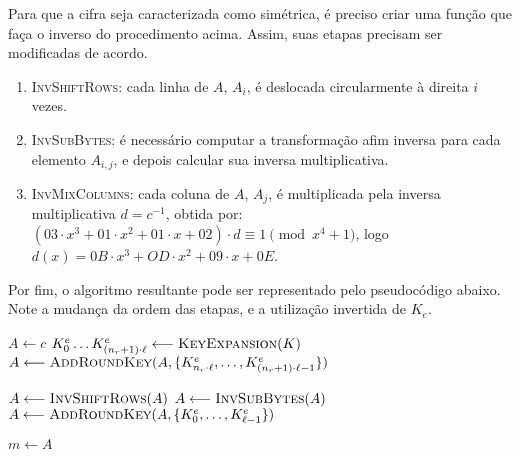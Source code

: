 \documentclass[12pt]{report}
\begin{document}
Para que a cifra seja caracterizada como simétrica, é preciso criar uma função que faça o inverso do procedimento acima. Assim, suas etapas precisam ser modificadas de acordo.

\begin{enumerate}[label=\roman*.]

    \item \textsc{InvShiftRows}: cada linha de $A$, $A_i$, é deslocada circularmente à direita $i$ vezes.

    \item \textsc{InvSubBytes}: é necessário computar a transformação afim inversa para cada elemento $A_{i,j}$, e depois calcular sua inversa multiplicativa.
    
    \item \textsc{InvMixColumns}: cada coluna de $A$, $A_j$, é multiplicada pela inversa multiplicativa $d = c^{-1}$, obtida por: $(03 \cdot x^{3} + 01 \cdot x^{2} + 01 \cdot x + 02) \cdot d \equiv 1 \pmod{x^{4} + 1}$, logo $d(x) = 0B \cdot x^{3} + OD \cdot x^{2} + 09 \cdot x + 0E$.

\end{enumerate}

Por fim, o algoritmo resultante pode ser representado pelo pseudocódigo abaixo. Note a mudança da ordem das etapas, e a utilização invertida de $K_e$.

\begin{algorithm}[H]
    \small

    $A \longleftarrow c$\;
    $K^{e}_{0} \dots K^{e}_{(n_r + 1) \cdot \ell}
        \longleftarrow \textsc{KeyExpansion}(K)$\;
    $A \longleftarrow \textsc{AddRoundKey}(A,
        \{K^{e}_{n_r \cdot \ell}, \dots, K^{e}_{(n_r + 1) \cdot \ell - 1}\})$\;
    
 
    $A \longleftarrow \textsc{InvShiftRows}(A)$\;
    $A \longleftarrow \textsc{InvSubBytes}(A)$\;
    $A \longleftarrow \textsc{AddRoundKey}(A,
        \{K^{e}_{0}, \dots, K^{e}_{\ell - 1}\})$\;

    $m \longleftarrow A$\;
\end{algorithm}
\end{document}
